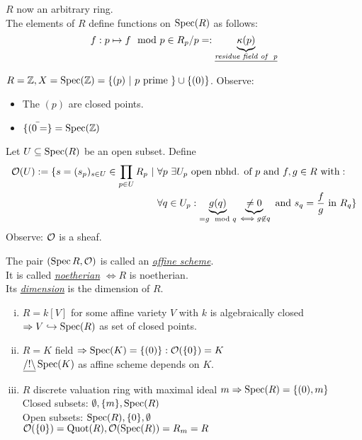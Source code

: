 \begin{Bem}
$R$ now an arbitrary ring.\\
The elements of $R$ define functions on $\operatorname{Spec}(R)$ as follows:
\[f: p \mapsto f \mod p \in R_p/p=:\underbrace{\kappa(p)}_{\emph{\underline{\text{residue field of } p}}}\]
\end{Bem}

\begin{Bsp}
$R=\mathbb{Z}, X=\operatorname{Spec}(\mathbb{Z})=\{(p) \ | \ p \text{ prime } \} \cup \{(0)\}$. Observe:
\begin{itemize}
\item The $(p)$ are closed points.
\item $\bar{\{(0=\}} = \operatorname{Spec}(\mathbb{Z})$
\end{itemize}
\end{Bsp}


\begin{defi}
Let $U \subseteq \operatorname{Spec}(R)$ be an open subset. Define
\begin{align*}
\mathcal{O}(U):=\{s=(s_p)_{s \in U} \in \prod_{p \in U} R_p \ | \ & \forall p \ \exists U_p \text{ open nbhd. of } p \text{ and } f,g \in R \text{ with}:\\
&\forall q \in U_p: \underbrace{g(q)}_{=g \mod q} \underbrace{\neq 0}_{\iff g \not \in q} \text{ and } s_q=\frac{f}{g} \text{ in } R_q\}
\end{align*}
Observe: $\mathcal{O}$ is a sheaf.
\end{defi}

\begin{defi}
The pair $(\operatorname{Spec} R, \mathcal{O})$ is called an \emph{\underline{affine scheme}}.\\
It is called \emph{\underline{noetherian}} $\iff R$ is noetherian.\\
Its \emph{\underline{dimension}} is the dimension of $R$.
\end{defi}

\begin{Bsp}
\begin{enumerate}[i)]
\item $R=k[V]$ for some affine variety $V$ with $k$ is algebraically closed\\
$\Rightarrow V \hookrightarrow \operatorname{Spec}(R)$ as set of closed points.
\item $R=K$ field $\Rightarrow \operatorname{Spec}(K)=\{(0)\}: \mathcal{O}(\{0\})=K$\\
$\underline{/!\backslash} \operatorname{Spec}(K)$ as affine scheme depends on $K$.
\item $R$ discrete valuation ring with maximal ideal $m \Rightarrow \operatorname{Spec}(R)=\{(0),m\}$\\
Closed subsets: $\emptyset, \{m\}, \operatorname{Spec}(R)$\\
Open subsets: $\operatorname{Spec}(R), \{0\}, \emptyset$\\
$\mathcal{O}(\{0\})=\operatorname{Quot}(R), \mathcal{O}(\operatorname{Spec}(R))=R_m=R$ 
\end{enumerate}
\end{Bsp}

